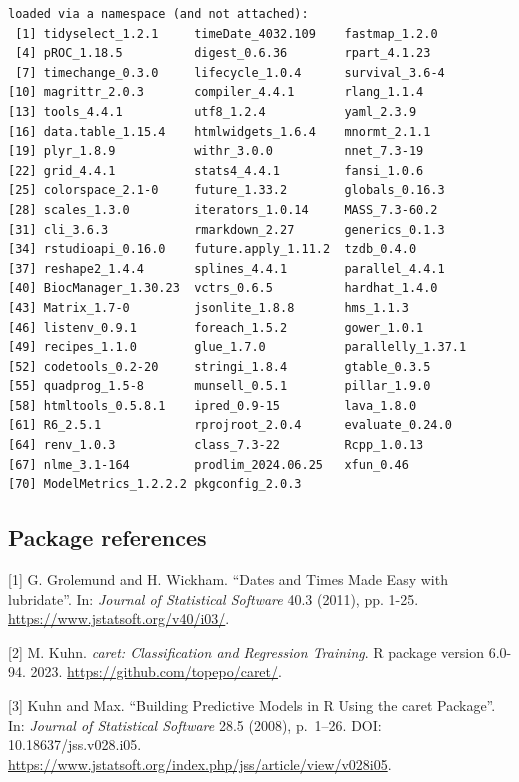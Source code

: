 \documentclass[
  letterpaper,
  DIV=11,
  numbers=noendperiod]{scrreprt}
\begin{document}
\begin{verbatim}
loaded via a namespace (and not attached):
 [1] tidyselect_1.2.1     timeDate_4032.109    fastmap_1.2.0       
 [4] pROC_1.18.5          digest_0.6.36        rpart_4.1.23        
 [7] timechange_0.3.0     lifecycle_1.0.4      survival_3.6-4      
[10] magrittr_2.0.3       compiler_4.4.1       rlang_1.1.4         
[13] tools_4.4.1          utf8_1.2.4           yaml_2.3.9          
[16] data.table_1.15.4    htmlwidgets_1.6.4    mnormt_2.1.1        
[19] plyr_1.8.9           withr_3.0.0          nnet_7.3-19         
[22] grid_4.4.1           stats4_4.4.1         fansi_1.0.6         
[25] colorspace_2.1-0     future_1.33.2        globals_0.16.3      
[28] scales_1.3.0         iterators_1.0.14     MASS_7.3-60.2       
[31] cli_3.6.3            rmarkdown_2.27       generics_0.1.3      
[34] rstudioapi_0.16.0    future.apply_1.11.2  tzdb_0.4.0          
[37] reshape2_1.4.4       splines_4.4.1        parallel_4.4.1      
[40] BiocManager_1.30.23  vctrs_0.6.5          hardhat_1.4.0       
[43] Matrix_1.7-0         jsonlite_1.8.8       hms_1.1.3           
[46] listenv_0.9.1        foreach_1.5.2        gower_1.0.1         
[49] recipes_1.1.0        glue_1.7.0           parallelly_1.37.1   
[52] codetools_0.2-20     stringi_1.8.4        gtable_0.3.5        
[55] quadprog_1.5-8       munsell_0.5.1        pillar_1.9.0        
[58] htmltools_0.5.8.1    ipred_0.9-15         lava_1.8.0          
[61] R6_2.5.1             rprojroot_2.0.4      evaluate_0.24.0     
[64] renv_1.0.3           class_7.3-22         Rcpp_1.0.13         
[67] nlme_3.1-164         prodlim_2024.06.25   xfun_0.46           
[70] ModelMetrics_1.2.2.2 pkgconfig_2.0.3     
\end{verbatim}

\subsection{Package references}\label{package-references-1}

{[}1{]} G. Grolemund and H. Wickham. ``Dates and Times Made Easy with
lubridate''. In: \emph{Journal of Statistical Software} 40.3 (2011), pp.
1-25. \url{https://www.jstatsoft.org/v40/i03/}.

{[}2{]} M. Kuhn. \emph{caret: Classification and Regression Training}. R
package version 6.0-94. 2023. \url{https://github.com/topepo/caret/}.

{[}3{]} Kuhn and Max. ``Building Predictive Models in R Using the caret
Package''. In: \emph{Journal of Statistical Software} 28.5 (2008),
p.~1--26. DOI: 10.18637/jss.v028.i05.
\url{https://www.jstatsoft.org/index.php/jss/article/view/v028i05}.
\end{document}
